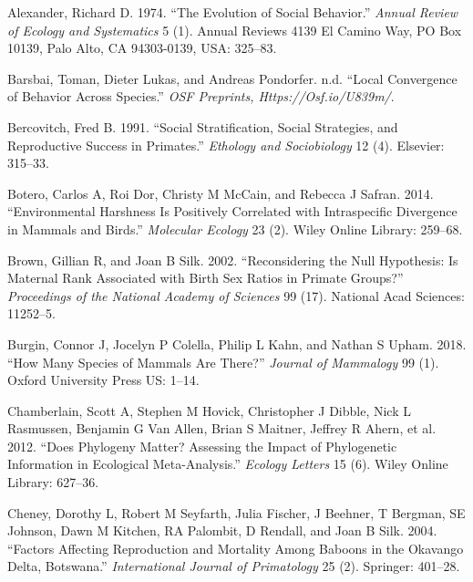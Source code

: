 \documentclass[]{article}
\begin{document}
\hypertarget{refs}{}
\leavevmode\hypertarget{ref-alexander1974evolution}{}%
Alexander, Richard D. 1974. ``The Evolution of Social Behavior.''
\emph{Annual Review of Ecology and Systematics} 5 (1). Annual Reviews
4139 El Camino Way, PO Box 10139, Palo Alto, CA 94303-0139, USA:
325--83.

\leavevmode\hypertarget{ref-barsbai2020similarity}{}%
Barsbai, Toman, Dieter Lukas, and Andreas Pondorfer. n.d. ``Local
Convergence of Behavior Across Species.'' \emph{OSF Preprints,
Https://Osf.io/U839m/}.

\leavevmode\hypertarget{ref-bercovitch1991social}{}%
Bercovitch, Fred B. 1991. ``Social Stratification, Social Strategies,
and Reproductive Success in Primates.'' \emph{Ethology and Sociobiology}
12 (4). Elsevier: 315--33.

\leavevmode\hypertarget{ref-botero2014environmental}{}%
Botero, Carlos A, Roi Dor, Christy M McCain, and Rebecca J Safran. 2014.
``Environmental Harshness Is Positively Correlated with Intraspecific
Divergence in Mammals and Birds.'' \emph{Molecular Ecology} 23 (2).
Wiley Online Library: 259--68.

\leavevmode\hypertarget{ref-brown2002reconsidering}{}%
Brown, Gillian R, and Joan B Silk. 2002. ``Reconsidering the Null
Hypothesis: Is Maternal Rank Associated with Birth Sex Ratios in Primate
Groups?'' \emph{Proceedings of the National Academy of Sciences} 99
(17). National Acad Sciences: 11252--5.

\leavevmode\hypertarget{ref-burgin2018many}{}%
Burgin, Connor J, Jocelyn P Colella, Philip L Kahn, and Nathan S Upham.
2018. ``How Many Species of Mammals Are There?'' \emph{Journal of
Mammalogy} 99 (1). Oxford University Press US: 1--14.

\leavevmode\hypertarget{ref-chamberlain2012does}{}%
Chamberlain, Scott A, Stephen M Hovick, Christopher J Dibble, Nick L
Rasmussen, Benjamin G Van Allen, Brian S Maitner, Jeffrey R Ahern, et
al. 2012. ``Does Phylogeny Matter? Assessing the Impact of Phylogenetic
Information in Ecological Meta-Analysis.'' \emph{Ecology Letters} 15
(6). Wiley Online Library: 627--36.

\leavevmode\hypertarget{ref-cheney2004factors}{}%
Cheney, Dorothy L, Robert M Seyfarth, Julia Fischer, J Beehner, T
Bergman, SE Johnson, Dawn M Kitchen, RA Palombit, D Rendall, and Joan B
Silk. 2004. ``Factors Affecting Reproduction and Mortality Among Baboons
in the Okavango Delta, Botswana.'' \emph{International Journal of
Primatology} 25 (2). Springer: 401--28.
\end{document}
